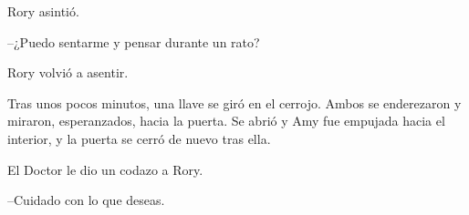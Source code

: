 {Rory asintió.}

{--¿Puedo sentarme y pensar durante un rato?}

{Rory volvió a asentir.}

{Tras unos pocos minutos, una llave se giró en el cerrojo. Ambos se
	enderezaron y miraron, esperanzados, hacia la puerta. Se abrió y Amy fue
empujada hacia el interior, y la puerta se cerró de nuevo tras ella.}

{El Doctor le dio un codazo a Rory.}

{--Cuidado con lo que deseas.}
